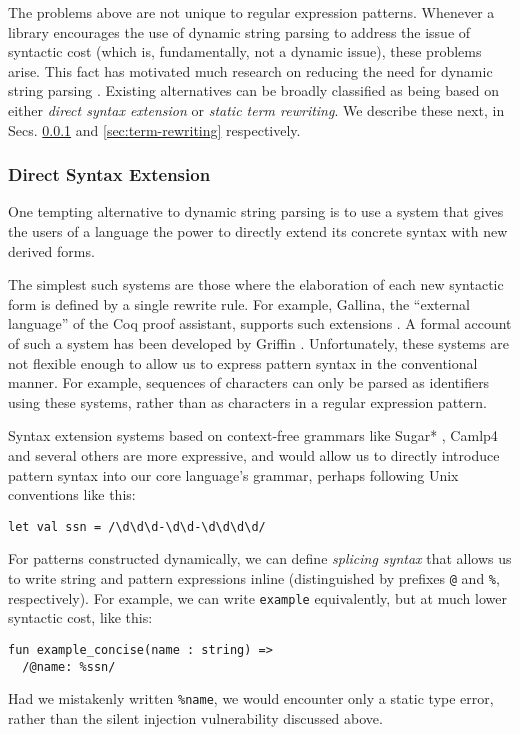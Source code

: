 The problems above are not unique to regular expression patterns. Whenever a library encourages the use of dynamic string parsing to address the issue of syntactic cost (which is, fundamentally, not a dynamic issue), these problems arise. %
	This fact has motivated much research on reducing the need for dynamic string parsing \cite{Bravenboer:2007:PIA:1289971.1289975}. Existing alternatives can be broadly classified as being based on either \emph{direct syntax extension} or \emph{static term rewriting}. We describe these next, in Secs. \ref{sec:syntax-extension} and \ref{sec:term-rewriting} respectively.%

\subsubsection{Direct Syntax Extension}\label{sec:syntax-extension}
One tempting alternative to dynamic string parsing is to use a system that gives the users of a language the power to directly extend its concrete syntax with new derived forms. %

The simplest such systems are those where the elaboration of each new syntactic form is defined by a single rewrite rule. For example, Gallina, the ``external language'' of the Coq proof assistant, supports such extensions \cite{Coq:manual}. A formal account of such a system has been developed by Griffin \cite{5134}. Unfortunately, these systems are not flexible enough to allow us to express pattern syntax in the conventional manner. For example, sequences of characters  can only be parsed as identifiers using these systems, rather than as characters in a regular expression pattern. 

Syntax extension systems based on context-free grammars like  Sugar* \cite{erdweg2013framework}, Camlp4 \cite{ocaml-manual} and several others are more expressive, and would allow us to directly introduce pattern syntax into our core language's grammar, perhaps following Unix conventions like this:
\begin{lstlisting}[numbers=none]
let val ssn = /\d\d\d-\d\d-\d\d\d\d/
\end{lstlisting}

For patterns constructed dynamically, we can define \emph{splicing syntax} that allows us to write string and pattern expressions inline (distinguished by prefixes \lstinline{@} and \lstinline{%}, respectively). 
For example, we can write \lstinline{example} equivalently, but at much lower syntactic cost, like this:
\begin{lstlisting}[numbers=none,escapechar=|]
fun example_concise(name : string) => 
  /@name: %ssn/
\end{lstlisting}
Had we mistakenly written \lstinline{%name}, we would encounter only a static type error, rather than the  silent injection  vulnerability discussed above. 

